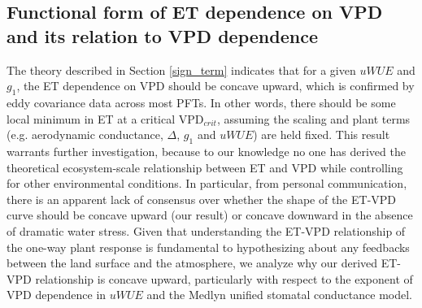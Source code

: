 \subsection{Functional form of ET dependence on VPD and its relation
  to VPD dependence}
\label{functional_form}

The theory described in Section \ref{sign_term} indicates that for a
given $uWUE$ and $g_1$, the ET dependence on VPD should be concave
upward, which is confirmed by eddy covariance data across most PFTs. In other words, there should be some local minimum in ET at a
critical VPD$_{crit}$, assuming the scaling and plant terms  (e.g. aerodynamic
conductance, $\Delta$, $g_1$ and $uWUE$) are held fixed. This result warrants further
investigation, because to our knowledge no one has derived the
theoretical ecosystem-scale relationship between ET and VPD while
controlling for other environmental conditions. In particular, from
personal communication, there is an apparent lack of consensus over
whether the shape of the ET-VPD curve should be concave upward (our
result) or concave downward in the absence of dramatic water stress. Given that understanding the ET-VPD
relationship of the one-way plant response is fundamental to
hypothesizing about any feedbacks between the land surface and the
atmosphere, we analyze why our derived ET-VPD relationship is concave
upward, particularly with respect to the exponent of VPD dependence in
$uWUE$ and the Medlyn unified stomatal conductance model.

